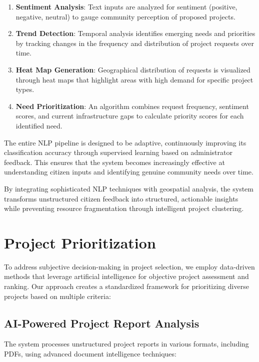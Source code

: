 \documentclass[12pt,a4paper]{report}
\begin{document}
\begin{enumerate}
    \item \textbf{Sentiment Analysis}: Text inputs are analyzed for sentiment (positive, negative, neutral) to gauge community perception of proposed projects.
    
    \item \textbf{Trend Detection}: Temporal analysis identifies emerging needs and priorities by tracking changes in the frequency and distribution of project requests over time.
    
    \item \textbf{Heat Map Generation}: Geographical distribution of requests is visualized through heat maps that highlight areas with high demand for specific project types.
    
    \item \textbf{Need Prioritization}: An algorithm combines request frequency, sentiment scores, and current infrastructure gaps to calculate priority scores for each identified need.
\end{enumerate}

\indent The entire NLP pipeline is designed to be adaptive, continuously improving its classification accuracy through supervised learning based on administrator feedback. This ensures that the system becomes increasingly effective at understanding citizen inputs and identifying genuine community needs over time.

\indent By integrating sophisticated NLP techniques with geospatial analysis, the system transforms unstructured citizen feedback into structured, actionable insights while preventing resource fragmentation through intelligent project clustering.

\section{Project Prioritization}
\indent \indent To address subjective decision-making in project selection, we employ data-driven methods that leverage artificial intelligence for objective project assessment and ranking. Our approach creates a standardized framework for prioritizing diverse projects based on multiple criteria:

\subsection{AI-Powered Project Report Analysis}
\indent \indent The system processes unstructured project reports in various formats, including PDFs, using advanced document intelligence techniques:
\end{document}
